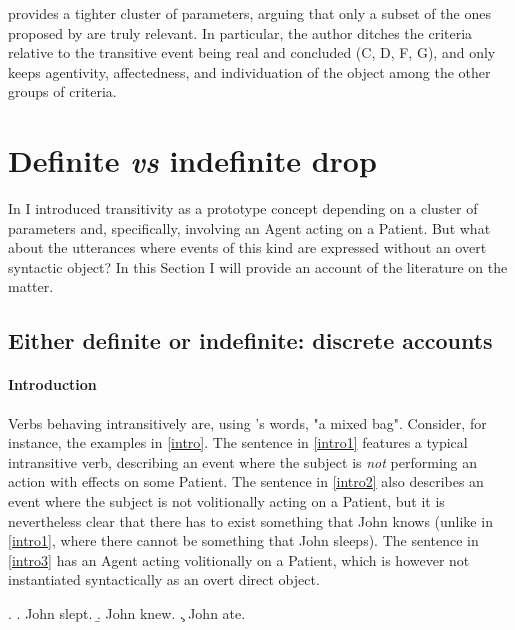 \textcite[78]{Lorenzetti2008} provides a tighter cluster of parameters, arguing that only a subset of the ones proposed by \textcite{HopperThompson1980} are truly relevant. In particular, the author ditches the criteria relative to the transitive event being real and concluded (C, D, F, G), and only keeps agentivity, affectedness, and individuation of the object among the other groups of criteria.


\section{Definite \textit{vs} indefinite drop} 

In  I introduced transitivity as a prototype concept depending on a cluster of parameters and, specifically, involving an Agent acting on a Patient. But what about the utterances where events of this kind are expressed without an overt syntactic object? In this Section I will provide an account of the literature on the matter.

\subsection{Either definite or indefinite: discrete accounts} 

\paragraph{Introduction}
Verbs behaving intransitively are, using \textcite[191]{rutherford1998workbook}'s words, "a mixed bag". Consider, for instance, the examples in \ref{intro}. The sentence in \ref{intro1} features a typical intransitive verb, describing an event where the subject is \textit{not} performing an action with effects on some Patient. The sentence in \ref{intro2} also describes an event where the subject is not volitionally acting on a Patient, but it is nevertheless clear that there has to exist something that John knows (unlike in \ref{intro1}, where there cannot be something that John sleeps). The sentence in \ref{intro3} has an Agent acting volitionally on a Patient, which is however not instantiated syntactically as an overt direct object.

\ex. \label{intro} \a. \label{intro1} John slept.
\b. \label{intro2} John knew.
\c. \label{intro3} John ate.

